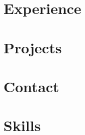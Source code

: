 \documentclass[a4paper]{article}
\begin{document}
\begin{paracol}{2}
  \begin{leftcolumn}
    \section*{Experience}
    

    \section*{Projects}
    
  \end{leftcolumn}

  \begin{rightcolumn}
    \section*{Contact}
    

    \section*{Skills}

  \end{rightcolumn}

\end{paracol}
\end{document}
